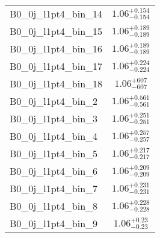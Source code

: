 \begin{tabular}{|l|c|}
B0\_0j\_l1pt4\_bin\_14 & $1.06^{+0.154}_{-0.154}$ \\
B0\_0j\_l1pt4\_bin\_15 & $1.06^{+0.189}_{-0.189}$ \\
B0\_0j\_l1pt4\_bin\_16 & $1.06^{+0.189}_{-0.189}$ \\
B0\_0j\_l1pt4\_bin\_17 & $1.06^{+0.224}_{-0.224}$ \\
B0\_0j\_l1pt4\_bin\_18 & $1.06^{+607}_{-607}$ \\
B0\_0j\_l1pt4\_bin\_2 & $1.06^{+0.561}_{-0.561}$ \\
B0\_0j\_l1pt4\_bin\_3 & $1.06^{+0.251}_{-0.251}$ \\
B0\_0j\_l1pt4\_bin\_4 & $1.06^{+0.257}_{-0.257}$ \\
B0\_0j\_l1pt4\_bin\_5 & $1.06^{+0.217}_{-0.217}$ \\
B0\_0j\_l1pt4\_bin\_6 & $1.06^{+0.209}_{-0.209}$ \\
B0\_0j\_l1pt4\_bin\_7 & $1.06^{+0.231}_{-0.231}$ \\
B0\_0j\_l1pt4\_bin\_8 & $1.06^{+0.228}_{-0.228}$ \\
B0\_0j\_l1pt4\_bin\_9 & $1.06^{+0.23}_{-0.23}$ \\
\hline
\end{tabular}
